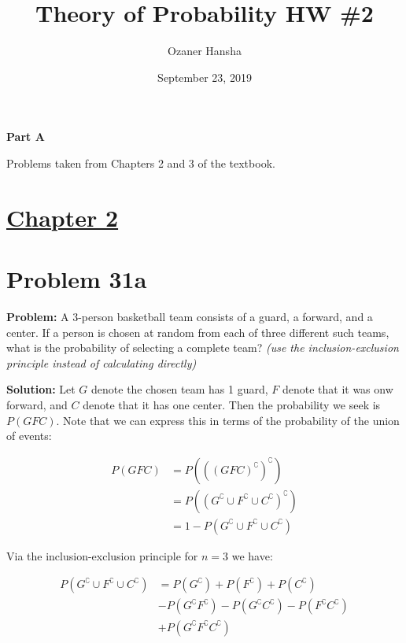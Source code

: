 \documentclass{article}
\begin{document}
\title{Theory of Probability HW \#2}
\author{Ozaner Hansha}
\date{September 23, 2019}
\maketitle

\begin{center}
    \Large{\textbf{Part A}}
\end{center}
Problems taken from Chapters 2 and 3 of the textbook.

\section*{\underline{Chapter 2}}

\section*{Problem 31a}
\noindent\textbf{Problem:} A 3-person basketball team consists of a guard, a forward, and a center. If a person is chosen at random from each of three different such teams, what is the probability of selecting a complete team? \textit{(use the inclusion-exclusion principle instead of calculating directly)}
\bigskip

\noindent\textbf{Solution:} Let $G$ denote the chosen team has 1 guard, $F$ denote that it was onw forward, and $C$ denote that it has one center. Then the probability we seek is $P(GFC)$. Note that we can express this in terms of the probability of the union of events:

\begin{align*}
    P(GFC)&=P(((GFC)^\complement)^\complement)\tag{involutory property}\\
    &=P((G^\complement\cup F^\complement\cup C^\complement)^\complement)\tag{DeMorgan's law}\\
    &=1-P(G^\complement\cup F^\complement\cup C^\complement)\tag{complement of event}
\end{align*}

Via the inclusion-exclusion principle for $n=3$ we have:

\begin{align*}
    P(G^\complement\cup F^\complement\cup C^\complement)&=P(G^\complement)+P(F^\complement)+P(C^\complement)\\
    &-P(G^\complement F^\complement)-P(G^\complement C^\complement)-P(F^\complement C^\complement)\\
    &+P(G^\complement F^\complement C^\complement)
\end{align*}
\end{document}
